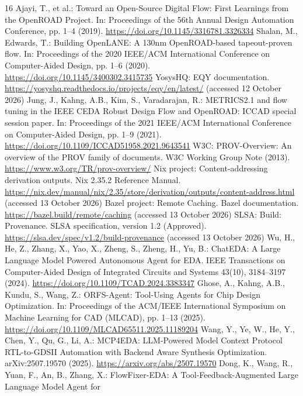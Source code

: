 \documentclass[runningheads]{llncs}
\begin{document}
\begin{thebibliography}{16}
Ajayi, T., et al.: Toward an Open-Source Digital Flow: First Learnings from the
OpenROAD Project. In: Proceedings of the 56th Annual Design Automation
Conference, pp. 1--4 (2019). \url{https://doi.org/10.1145/3316781.3326334}
Shalan, M., Edwards, T.: Building OpenLANE: A 130nm OpenROAD-based
tapeout-proven flow. In: Proceedings of the 2020 IEEE/ACM International
Conference on Computer-Aided Design, pp. 1--6 (2020).
\url{https://doi.org/10.1145/3400302.3415735}
YosysHQ: EQY documentation. \url{https://yosyshq.readthedocs.io/projects/eqy/en/latest/}
(accessed 12 October 2026)
Jung, J., Kahng, A.B., Kim, S., Varadarajan, R.: METRICS2.1 and flow tuning
in the IEEE CEDA Robust Design Flow and OpenROAD: ICCAD special session paper.
In: Proceedings of the 2021 IEEE/ACM International Conference on Computer-Aided
Design, pp. 1--9 (2021). \url{https://doi.org/10.1109/ICCAD51958.2021.9643541}
W3C: PROV-Overview: An overview of the PROV family of documents.
W3C Working Group Note (2013). \url{https://www.w3.org/TR/prov-overview/}
Nix project: Content-addressing derivation outputs. Nix 2.35.2 Reference Manual.
\url{https://nix.dev/manual/nix/2.35/store/derivation/outputs/content-address.html}
(accessed 13 October 2026)
Bazel project: Remote Caching. Bazel documentation.
\url{https://bazel.build/remote/caching} (accessed 13 October 2026)
SLSA: Build: Provenance. SLSA specification, version 1.2 (Approved).
\url{https://slsa.dev/spec/v1.2/build-provenance} (accessed 13 October 2026)
Wu, H., He, Z., Zhang, X., Yao, X., Zheng, S., Zheng, H., Yu, B.:
ChatEDA: A Large Language Model Powered Autonomous Agent for EDA.
IEEE Transactions on Computer-Aided Design of Integrated Circuits and Systems
43(10), 3184--3197 (2024). \url{https://doi.org/10.1109/TCAD.2024.3383347}
Ghose, A., Kahng, A.B., Kundu, S., Wang, Z.:
ORFS-Agent: Tool-Using Agents for Chip Design Optimization.
In: Proceedings of the ACM/IEEE International Symposium on Machine Learning
for CAD (MLCAD), pp. 1--13 (2025). \url{https://doi.org/10.1109/MLCAD65511.2025.11189204}
Wang, Y., Ye, W., He, Y., Chen, Y., Qu, G., Li, A.:
MCP4EDA: LLM-Powered Model Context Protocol RTL-to-GDSII Automation with
Backend Aware Synthesis Optimization. arXiv:2507.19570 (2025).
\url{https://arxiv.org/abs/2507.19570}
Dong, K., Wang, R., Yuan, F., An, B., Zhang, X.: FlowFixer-EDA: A Tool-Feedback-Augmented Large Language Model Agent for

\end{thebibliography}
\end{document}
